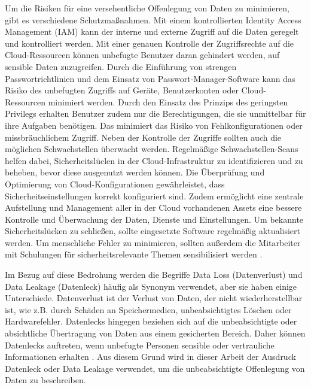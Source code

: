 Um die Risiken für eine versehentliche Offenlegung von Daten zu minimieren, gibt es verschiedene Schutzmaßnahmen. Mit einem kontrollierten Identity Access Management (IAM) kann der interne und externe Zugriff auf die Daten geregelt und kontrolliert werden. Mit einer genauen Kontrolle der Zugriffsrechte auf die Cloud-Ressourcen können unbefugte Benutzer daran gehindert werden, auf sensible Daten zuzugreifen. Durch die Einführung von strengen Passwortrichtlinien und dem Einsatz von Passwort-Manager-Software kann das Risiko des unbefugten Zugriffs auf Geräte, Benutzerkonten oder Cloud-Ressourcen minimiert werden. Durch den Einsatz des Prinzips des geringsten Privilegs erhalten Benutzer zudem nur die Berechtigungen, die sie unmittelbar für ihre Aufgaben benötigen. Das minimiert das Risiko von Fehlkonfigurationen oder missbräuchlichem Zugriff. Neben der Kontrolle der Zugriffe sollten auch die möglichen Schwachstellen überwacht werden. Regelmäßige Schwachstellen-Scans helfen dabei, Sicherheitslüclen in der Cloud-Infrastruktur zu identifizieren und zu beheben, bevor diese ausgenutzt werden können. Die Überprüfung und Optimierung von Cloud-Konfigurationen gewährleistet, dass Sicherheitseinstellungen korrekt konfiguriert sind. Zudem ermöglicht eine zentrale Aufstellung und Management aller in der Cloud vorhandenen Assets eine bessere Kontrolle und Überwachung der Daten, Dienste und Einstellungen. Um bekannte Sicherheitslücken zu schließen, sollte eingesetzte Software regelmäßig aktualisiert werden. Um menschliche Fehler zu minimieren, sollten außerdem die Mitarbeiter mit Schulungen für sicherheitsrelevante Themen sensibilisiert werden \cite{Brindha.2015}.

Im Bezug auf diese Bedrohung werden die Begriffe Data Loss (Datenverlust) und Data Leakage (Datenleck) häufig als Synonym verwendet, aber sie haben einige Unterschiede. Datenverlust ist der Verlust von Daten, der nicht wiederherstellbar ist, wie z.B. durch Schäden an Speichermedien, unbeabsichtigtes Löschen oder Hardwarefehler. Datenlecks hingegen beziehen sich auf die unbeabsichtigte oder absichtliche Übertragung von Daten aus einem gesicherten Bereich. Daher können Datenlecks auftreten, wenn unbefugte Personen sensible oder vertrauliche Informationen erhalten \cite{Proofpoint.2021b}. Aus diesem Grund wird in dieser Arbeit der Ausdruck Datenleck oder Data Leakage verwendet, um die unbeabsichtigte Offenlegung von Daten zu beschreiben.


